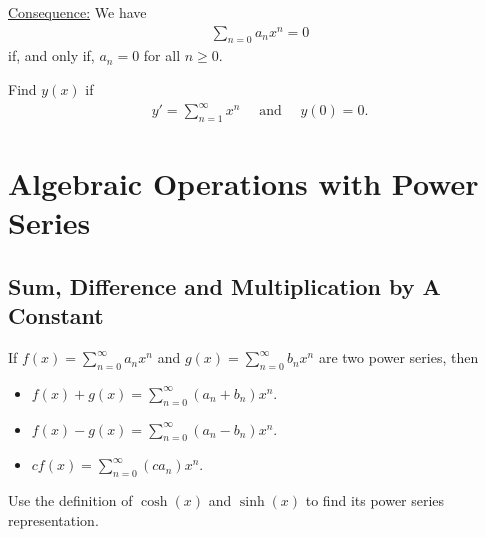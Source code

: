 \documentclass[12pt,a4paper]{article}
\newcounter{example}[section]
\begin{document}
\vspace*{16pt}
	
\underline{Consequence:}
	We have
		\begin{align*}
		\sum_{n = 0} a_n x^n = 0
		\end{align*}
	if, and only if, $a_n = 0$ for all $n \geq 0$.
	
\vspace*{16pt}

\begin{example}
Find $y(x)$ if
	\begin{align*}
	y' = \sum_{n = 1}^\infty x^n \quad \text{ and } \quad y(0) = 0 .
	\end{align*}
\end{example}

\newpage

\section{Algebraic Operations with Power Series}

\subsection{Sum, Difference and Multiplication by A Constant}
If $f(x) = \sum_{n = 0}^\infty a_n x^n$ and $g(x) = \sum_{n = 0}^\infty b_n x^n$ are two power series, then
	\begin{itemize}
	\item $ \displaystyle f(x) + g(x) = \sum_{n = 0}^\infty (a_n + b_n) x^n$.
	\item $\displaystyle f(x) - g(x) = \sum_{n =0}^\infty (a_n - b_n) x^n$.
	\item $\displaystyle c f(x) = \sum_{n = 0}^\infty (ca_n) x^n$.
	\end{itemize}
	
\vspace*{16pt}
	
\begin{example}
Use the definition of $\cosh (x)$ and $\sinh (x)$ to find its power series representation.
\end{example}

\newpage
\end{document}
